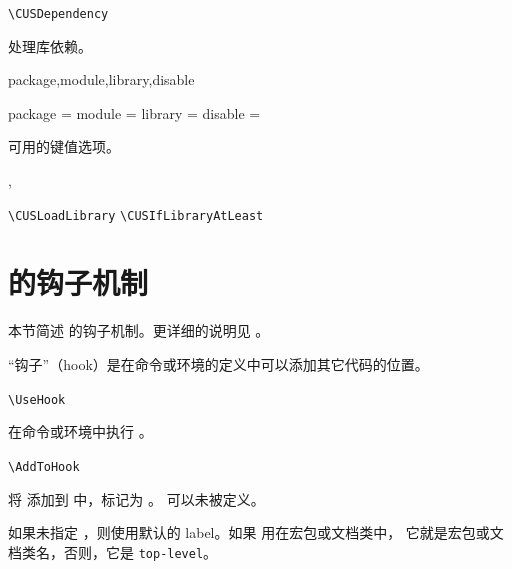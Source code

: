 \documentclass[twoside]{book}
\begin{document}
\begin{function}[module=cus]{\CUSDependency}
\begin{syntax}
  \verb|\CUSDependency| 
\end{syntax}
处理库依赖。
\end{function}

\begin{keyval}[path=dependency]{package,module,library,disable}
\begin{syntax}
  package = 
  module  = 
  library = 
  disable = 
\end{syntax}
 可用的键值选项。
\end{keyval}

\begin{function}[module=cus]{\CUSLoadLibrary,\CUSIfLibraryAtLeast}
\begin{syntax}
  \verb|\CUSLoadLibrary|       
  \verb|\CUSIfLibraryAtLeast|    
\end{syntax}
\end{function}


\section{\LaTeXe 的钩子机制}\label{sec:lthooks}

本节简述 \LaTeXe 的钩子机制。更详细的说明见 。

“钩子”（hook）是在命令或环境的定义中可以添加其它代码的位置。

\begin{function}[module=lthooks]{\UseHook}
  \begin{syntax}
    \verb|\UseHook| 
  \end{syntax}
在命令或环境中执行 。
\end{function}

\begin{function}[module=lthooks]{\AddToHooks}
  \begin{syntax}
    \verb|\AddToHook|   
  \end{syntax}
将  添加到  中，标记为 。 可以未被定义。

如果未指定 ，则使用默认的 label。如果  用在宏包或文档类中，
它就是宏包或文档类名，否则，它是 \texttt{top-level}。
\end{function}
\end{document}
